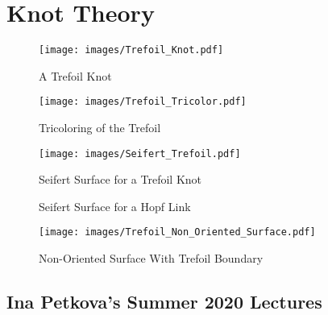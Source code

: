 \chapter{Knot Theory}
    \begin{figure}[H]
        \centering
        \texttt{[image: images/Trefoil\_Knot.pdf]}
        \caption{A Trefoil Knot}
        \label{fig:Trefoil_Knot}
    \end{figure}
    \begin{figure}[H]
        \centering
        \texttt{[image: images/Trefoil\_Tricolor.pdf]}
        \caption{Tricoloring of the Trefoil}
        \label{fig:Trefoil_Tricoloring}
    \end{figure}
    \begin{figure}[H]
        \centering
        \texttt{[image: images/Seifert\_Trefoil.pdf]}
        \caption{Seifert Surface for a Trefoil Knot}
        \label{fig:Seifert_Surface_Trefoil}
    \end{figure}
    \begin{figure}[H]
        \centering
        \caption{Seifert Surface for a Hopf Link}
        \label{fig:Seifert_Surface_Hopf_Link}
    \end{figure}
    \begin{figure}[H]
        \centering
        \texttt{[image: images/Trefoil\_Non\_Oriented\_Surface.pdf]}
        \caption{Non-Oriented Surface With Trefoil Boundary}
        \label{fig:Trefoil_Non_Oriented_Surface}
    \end{figure}
\section{Ina Petkova's Summer 2020 Lectures}
